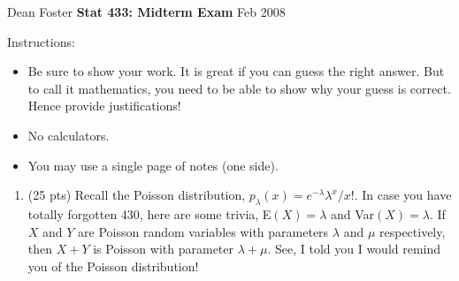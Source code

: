 \documentclass[12pt]{article}
\begin{document}
Dean Foster \hfill {\bf Stat 433: Midterm Exam} \hfill Feb 2008
\vspace{1em}

Instructions:
\begin{itemize}
\item Be sure to show your work.  It is great if you can guess the right
answer.  But to call it mathematics, you need to be able to show why
your guess is correct.  Hence provide justifications!
\item No calculators.
\item You may use a single page of notes (one side).
\end{itemize}

\begin{enumerate}
\item (25 pts) Recall the Poisson distribution, $p_\lambda(x) =
 e^{-\lambda} \lambda^x/x!$.  In case you have totally forgotten 430,
 here are some trivia, E$(X) = \lambda$ and Var$(X) = \lambda$.  If
 $X$ and $Y$ are Poisson random variables with parameters $\lambda$
 and $\mu$ respectively, then $X+Y$ is Poisson with parameter $\lambda
 + \mu$.  See, I told you I would remind you of the Poisson
 distribution!


\end{enumerate}
\end{document}
